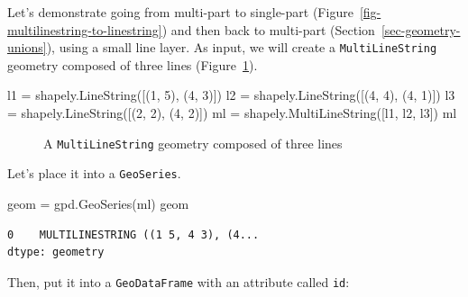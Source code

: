 \documentclass[
  letterpaper,
]{krantz}
\newenvironment{Shaded}{\begin{snugshade}}{\end{snugshade}}
\newcommand{\DecValTok}[1]{\textcolor[rgb]{0.68,0.00,0.00}{#1}}
\newcommand{\NormalTok}[1]{\textcolor[rgb]{0.00,0.23,0.31}{#1}}
\newcommand{\OperatorTok}[1]{\textcolor[rgb]{0.37,0.37,0.37}{#1}}
\begin{document}
Let's demonstrate going from multi-part to single-part
(Figure~\ref{fig-multilinestring-to-linestring}) and then back to
multi-part (Section~\ref{sec-geometry-unions}), using a small line
layer. As input, we will create a
\texttt{\textquotesingle{}MultiLineString\textquotesingle{}} geometry
composed of three lines
(Figure~\ref{fig-type-transform-multilinestring3}).

\begin{Shaded}
\begin{Highlighting}[]
\NormalTok{l1 }\OperatorTok{=}\NormalTok{ shapely.LineString([(}\DecValTok{1}\NormalTok{, }\DecValTok{5}\NormalTok{), (}\DecValTok{4}\NormalTok{, }\DecValTok{3}\NormalTok{)])}
\NormalTok{l2 }\OperatorTok{=}\NormalTok{ shapely.LineString([(}\DecValTok{4}\NormalTok{, }\DecValTok{4}\NormalTok{), (}\DecValTok{4}\NormalTok{, }\DecValTok{1}\NormalTok{)])}
\NormalTok{l3 }\OperatorTok{=}\NormalTok{ shapely.LineString([(}\DecValTok{2}\NormalTok{, }\DecValTok{2}\NormalTok{), (}\DecValTok{4}\NormalTok{, }\DecValTok{2}\NormalTok{)])}
\NormalTok{ml }\OperatorTok{=}\NormalTok{ shapely.MultiLineString([l1, l2, l3])}
\NormalTok{ml}
\end{Highlighting}
\end{Shaded}

\begin{figure}[H]


\caption{\label{fig-type-transform-multilinestring3}A
\texttt{\textquotesingle{}MultiLineString\textquotesingle{}} geometry
composed of three lines}

\end{figure}%

Let's place it into a \texttt{GeoSeries}.

\begin{Shaded}
\begin{Highlighting}[]
\NormalTok{geom }\OperatorTok{=}\NormalTok{ gpd.GeoSeries(ml)}
\NormalTok{geom}
\end{Highlighting}
\end{Shaded}

\begin{verbatim}
0    MULTILINESTRING ((1 5, 4 3), (4...
dtype: geometry
\end{verbatim}

Then, put it into a \texttt{GeoDataFrame} with an attribute called
\texttt{\textquotesingle{}id\textquotesingle{}}:
\end{document}

